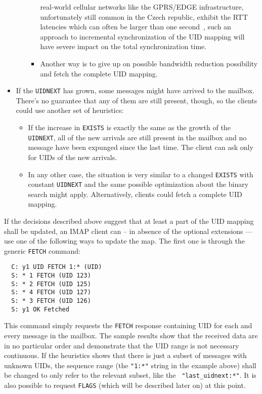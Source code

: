 \documentclass[trojita]{subfiles}
\begin{document}
\begin{itemize}
\begin{itemize}
\begin{itemize}
            real-world cellular networks like the GPRS/EDGE infrastructure, unfortunately still common in the Czech
            republic, exhibit the RTT latencies which can often be larger than one second~\cite{gprs-rtt-report}, such
            an approach to incremental synchronization of the UID mapping will have severe impact on the total
            synchronization time.
          \item Another way is to give up on possible bandwidth reduction possibility and fetch the complete UID
            mapping.
        \end{itemize}
    \end{itemize}
  \item If the {\tt UIDNEXT} has grown, some messages might have arrived to the mailbox.  There's no guarantee that any
    of them are still present, though, so the clients could use another set of heuristics:
    \begin{itemize}
      \item If the increase in {\tt EXISTS} is exactly the same as the growth of the {\tt UIDNEXT}, all of the new
        arrivals are still present in the mailbox and no message have been expunged since the last time.  The client can
        ask only for UIDs of the new arrivals.
      \item In any other case, the situation is very similar to a changed {\tt EXISTS} with constant {\tt UIDNEXT} and
        the same possible optimization about the binary search might apply.  Alternatively, clients could fetch a
        complete UID mapping.
    \end{itemize}
\end{itemize}

If the decisions described above suggest that at least a part of the UID mapping shall be updated, an IMAP client can --
in absence of the optional extensions --- use one of the following ways to update the map.  The first one is through the
generic {\tt FETCH} command:

\begin{verbatim}
  C: y1 UID FETCH 1:* (UID)
  S: * 1 FETCH (UID 123)
  S: * 2 FETCH (UID 125)
  S: * 4 FETCH (UID 127)
  S: * 3 FETCH (UID 126)
  S: y1 OK Fetched
\end{verbatim}

This command simply requests the {\tt FETCH} response containing UID for each and every message in the mailbox.  The
sample results show that the received data are in no particular order and demonstrate that the UID range is not
necessary continuous.  If the heuristics shows that there is just a subset of messages with unknown UIDs, the sequence
range (the {\tt "1:*"} string in the example above) shall be changed to only refer to the relevant subset, like the {\tt
"last\_uidnext:*"}.  It is also possible to request {\tt FLAGS} (which will be described later on) at this point.
\end{document}
